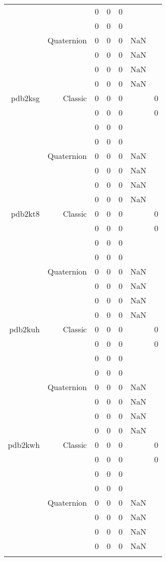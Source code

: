 \begin{xltabular}{\textwidth}{r|rcccSc}
& & 0 & 0 & 0 & & \\
& & 0 & 0 & 0 & & \\
& Quaternion & 0 & 0 & 0 & NaN & \\
& & 0 & 0 & 0 & NaN & \\
& & 0 & 0 & 0 & NaN & \\
& & 0 & 0 & 0 & NaN & \\ \addlinespace
pdb2ksg & Classic & 0 & 0 & 0 & & 0 \\
& & 0 & 0 & 0 & & 0 \\
& & 0 & 0 & 0 & & \\
& & 0 & 0 & 0 & & \\
& Quaternion & 0 & 0 & 0 & NaN & \\
& & 0 & 0 & 0 & NaN & \\
& & 0 & 0 & 0 & NaN & \\
& & 0 & 0 & 0 & NaN & \\ \addlinespace
pdb2kt8 & Classic & 0 & 0 & 0 & & 0 \\
& & 0 & 0 & 0 & & 0 \\
& & 0 & 0 & 0 & & \\
& & 0 & 0 & 0 & & \\
& Quaternion & 0 & 0 & 0 & NaN & \\
& & 0 & 0 & 0 & NaN & \\
& & 0 & 0 & 0 & NaN & \\
& & 0 & 0 & 0 & NaN & \\ \addlinespace
pdb2kuh & Classic & 0 & 0 & 0 & & 0 \\
& & 0 & 0 & 0 & & 0 \\
& & 0 & 0 & 0 & & \\
& & 0 & 0 & 0 & & \\
& Quaternion & 0 & 0 & 0 & NaN & \\
& & 0 & 0 & 0 & NaN & \\
& & 0 & 0 & 0 & NaN & \\
& & 0 & 0 & 0 & NaN & \\ \addlinespace
pdb2kwh & Classic & 0 & 0 & 0 & & 0 \\
& & 0 & 0 & 0 & & 0 \\
& & 0 & 0 & 0 & & \\
& & 0 & 0 & 0 & & \\
& Quaternion & 0 & 0 & 0 & NaN & \\
& & 0 & 0 & 0 & NaN & \\
& & 0 & 0 & 0 & NaN & \\
& & 0 & 0 & 0 & NaN & \\ \addlinespace

\end{xltabular}
